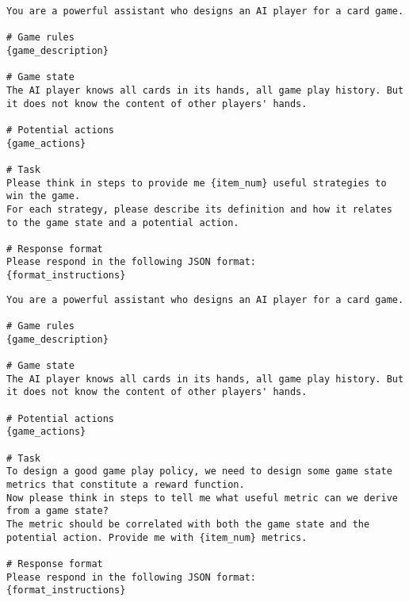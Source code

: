 \begin{tcolorbox}[
breakable,
title=Design game policy components (strategy style) in text,  
colframe=promptcolor, 
colback=white,
]
\begin{lstlisting}[]
You are a powerful assistant who designs an AI player for a card game.

# Game rules
{game_description}

# Game state
The AI player knows all cards in its hands, all game play history. But it does not know the content of other players' hands.

# Potential actions
{game_actions}

# Task
Please think in steps to provide me {item_num} useful strategies to win the game.
For each strategy, please describe its definition and how it relates to the game state and a potential action.

# Response format
Please respond in the following JSON format:
{format_instructions}
\end{lstlisting}
\end{tcolorbox}

\begin{tcolorbox}[
breakable,
title=Design game policy components (metric style) in text,  
colframe=promptcolor, 
colback=white,
]
\begin{lstlisting}[]
You are a powerful assistant who designs an AI player for a card game.

# Game rules
{game_description}

# Game state
The AI player knows all cards in its hands, all game play history. But it does not know the content of other players' hands.

# Potential actions
{game_actions}

# Task
To design a good game play policy, we need to design some game state metrics that constitute a reward function.
Now please think in steps to tell me what useful metric can we derive from a game state?
The metric should be correlated with both the game state and the potential action. Provide me with {item_num} metrics.

# Response format
Please respond in the following JSON format:
{format_instructions}
\end{lstlisting}
\end{tcolorbox}


